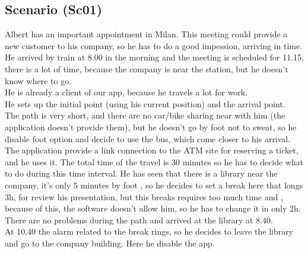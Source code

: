 \documentclass[a4paper,leqno]{book}
\begin{document}
\subsection{Scenario (Sc01) }
Albert has an important appointment in Milan. 
This meeting could provide a new customer to his company, so he has to do a good impession, arriving in time.\\
He arrived by train at 8.00 in the morning and the meeting is scheduled for 11.15, there is a lot of time, because 
the company is near the station, but he doesn't know where to go.\\
He is already a client of our app, because he travels a lot for work.\\
He sets up the initial point (using his current position) and the arrival point.\\
The path is very short, and there are no car/bike sharing near with him (the application doesn't provide them), but he doesn't go by foot not to sweat,
so he disable foot option and decide to use the bus, which come closer to his arrival.\\
The application provide a link connection to the ATM site for reserving a ticket, and he uses it.
The total time of the travel is 30 minutes so he has to decide what to do during this time interval.
He has seen that there is a library near the company, it's only 5 minutes by foot , so he decides to set a break here that longs 3h, for review his presentation,
but this breaks requires too much time and , because of this, the software doesn't allow him, so he has to change it in only 2h.
There are no problems during the path and arrived at the library at 8.40.\\
At 10.40 the alarm related to the break rings, so he decides to leave the library and go to the company building. 
Here he disable the app.
\end{document}
